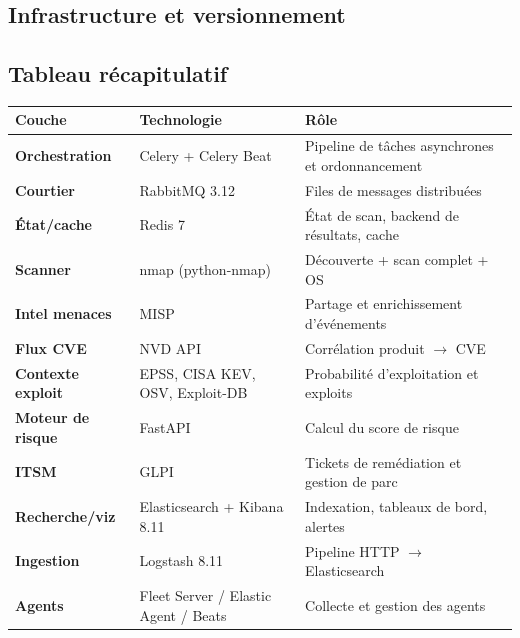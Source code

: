 \subsection{Infrastructure et versionnement}



\subsection{Tableau r\'ecapitulatif}

\begin{center}
\small
\begin{tabularx}{\linewidth}{@{}>{\bfseries}l l X@{}}
\toprule
\textbf{Couche} & \textbf{Technologie} & \textbf{R\^ole} \\
\midrule
Orchestration & Celery + Celery Beat & Pipeline de t\^aches asynchrones et ordonnancement \\
Courtier & RabbitMQ 3.12 & Files de messages distribu\'ees \\
\'Etat/cache & Redis 7 & \'Etat de scan, backend de r\'esultats, cache \\
Scanner & nmap (python-nmap) & D\'ecouverte + scan complet + OS \\
Intel menaces & MISP & Partage et enrichissement d'\'ev\'enements \\
Flux CVE & NVD API & Corr\'elation produit $\rightarrow$ CVE \\
Contexte exploit & EPSS, CISA KEV, OSV, Exploit-DB & Probabilit\'e d'exploitation et exploits \\
Moteur de risque & FastAPI & Calcul du score de risque \\
ITSM & GLPI & Tickets de rem\'ediation et gestion de parc \\
Recherche/viz & Elasticsearch + Kibana 8.11 & Indexation, tableaux de bord, alertes \\
Ingestion & Logstash 8.11 & Pipeline HTTP $\rightarrow$ Elasticsearch \\
Agents & Fleet Server / Elastic Agent / Beats & Collecte et gestion des agents \\
\bottomrule
\end{tabularx}
\end{center}
